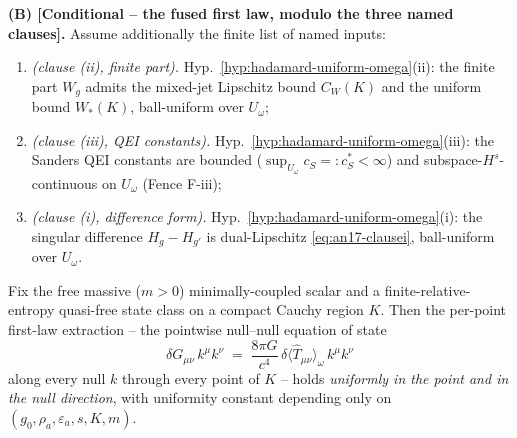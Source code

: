 \begin{theorem}
\smallskip
\textup{\textbf{(B) [Conditional -- the fused first law, modulo the three
named clauses].}}  Assume additionally the finite list of named inputs:
\begin{enumerate}[label=\textup{(M\arabic*)},leftmargin=*,nosep]
  \item\label{hyp:an17-M1} \emph{(clause (ii), finite part).}
    Hyp.~\ref{hyp:hadamard-uniform-omega}(ii): the finite part $W_g$
    admits the mixed-jet Lipschitz bound $C_W(K)$ and the uniform bound
    $W_*(K)$, ball-uniform over $U_\omega$;
  \item\label{hyp:an17-M2} \emph{(clause (iii), QEI constants).}
    Hyp.~\ref{hyp:hadamard-uniform-omega}(iii): the Sanders QEI
    constants are bounded ($\sup_{U_\omega}c_S=:c_S^*<\infty$) and
    subspace-$H^s$-continuous on $U_\omega$ (Fence F-iii);
  \item\label{hyp:an17-M3} \emph{(clause (i), difference form).}
    Hyp.~\ref{hyp:hadamard-uniform-omega}(i): the singular difference
    $H_g-H_{g'}$ is dual-Lipschitz \eqref{eq:an17-clausei}, ball-uniform
    over $U_\omega$.
\end{enumerate}
Fix the free massive ($m>0$) minimally-coupled scalar and a
finite-relative-entropy quasi-free state class on a compact Cauchy
region $K$.  Then the per-point first-law extraction -- the pointwise
null--null equation of state
\[
  \delta G_{\mu\nu}\,k^\mu k^\nu
  \;=\;\frac{8\pi G}{c^4}\,
    \delta\langle\widehat T_{\mu\nu}\rangle_\omega\,k^\mu k^\nu
\]
along every null $k$ through every point of $K$ -- holds \emph{uniformly
in the point and in the null direction}, with uniformity constant
depending only on $(g_0,\rho_a,\varepsilon_a,s,K,m)$.
\end{theorem}

